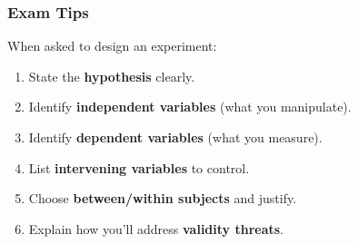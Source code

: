 \subsubsection*{Exam Tips}

\begin{tipbox}
When asked to design an experiment:
\begin{enumerate}
  \item State the \textbf{hypothesis} clearly.
  \item Identify \textbf{independent variables} (what you manipulate).
  \item Identify \textbf{dependent variables} (what you measure).
  \item List \textbf{intervening variables} to control.
  \item Choose \textbf{between/within subjects} and justify.
  \item Explain how you'll address \textbf{validity threats}.
\end{enumerate}
\end{tipbox}


